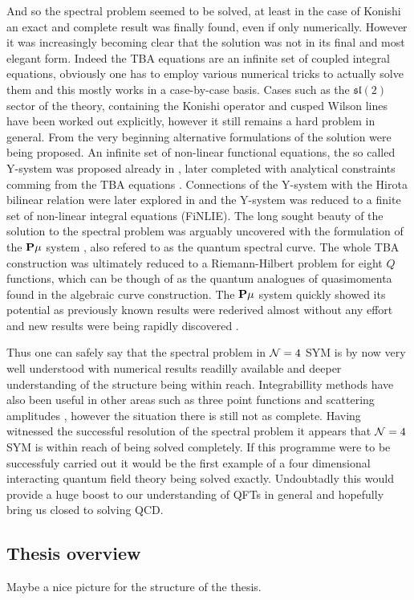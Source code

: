 And so the spectral problem seemed to be solved, at least in the case of Konishi an exact and complete result was finally found, even if only numerically.
However it was increasingly becoming clear that the solution was not in its final and most elegant form.
Indeed the TBA equations are an infinite set of coupled integral equations, obviously one has to employ various numerical tricks to actually solve them and this mostly works in a case-by-case basis. 
Cases such as the $\mathfrak{sl}(2)$ sector of the theory, containing the Konishi operator \cite{Gromov:2009bc} and cusped Wilson lines \cite{Correa:2012hh, Gromov:2012eu} have been worked out explicitly, however it still remains a hard problem in general.
From the very beginning alternative formulations of the solution were being proposed. 
An infinite set of non-linear functional equations, the so called Y-system was proposed already in \cite{Gromov:2009bc}, later completed with analytical constraints comming from the TBA equations \cite{Cavaglia:2010nm}.
Connections of the Y-system with the Hirota bilinear relation were later explored in \cite{Gromov:2011cx} and the Y-system was reduced to a finite set of non-linear integral equations (FiNLIE).
The long sought beauty of the solution to the spectral problem was arguably uncovered with the formulation of the ${\bf P}\mu$ system \cite{Gromov:2013pga}, also refered to as the quantum spectral curve.
The whole TBA construction was ultimately reduced to a Riemann-Hilbert problem for eight $Q$ functions, which can be though of as the quantum analogues of quasimomenta found in the algebraic curve construction.
The ${\bf P}\mu$ system quickly showed its potential as previously known results were rederived almost without any effort and new results were being rapidly discovered \cite{Gromov:2013qga, Gromov:2014bva}.

Thus one can safely say that the spectral problem in $\mathcal{N}=4$ SYM is by now very well understood with numerical results readilly available and deeper understanding of the structure being within reach.
Integrabillity methods have also been useful in other areas such as three point functions \cite{Escobedo:2010xs, Gromov:2012vu} and scattering amplitudes \cite{Drummond:2010km, Alday:2010kn}, however the situation there is still not as complete.
Having witnessed the successful resolution of the spectral problem it appears that $\mathcal{N}=4$ SYM is within reach of being solved completely.
If this programme were to be successfuly carried out it would be the first example of a four dimensional interacting quantum field theory being solved exactly.
Undoubtadly this would provide a huge boost to our understanding of QFTs in general and hopefully bring us closed to solving QCD.

\subsection{Thesis overview}

Maybe a nice picture for the structure of the thesis.
